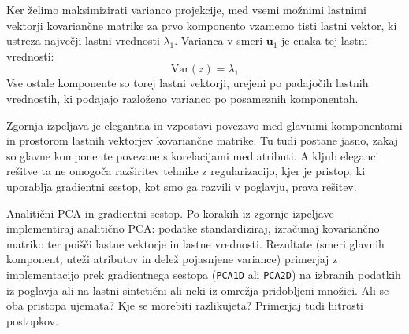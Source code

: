 \begin{enumerate}
Ker želimo maksimizirati varianco projekcije, med vsemi možnimi lastnimi vektorji kovariančne matrike za prvo komponento vzamemo tisti lastni vektor, ki ustreza največji lastni vrednosti \( \lambda_1 \). Varianca v smeri \( \mathbf{u}_1 \) je enaka tej lastni vrednosti:
%
\[
\mathrm{Var}(z) = \lambda_1
\]
Vse ostale komponente so torej lastni vektorji, urejeni po padajočih lastnih vrednostih, ki podajajo razloženo varianco po posameznih komponentah.
\end{enumerate}

Zgornja izpeljava je elegantna in vzpostavi povezavo med glavnimi komponentami in prostorom lastnih vektorjev kovariančne matrike. Tu tudi postane jasno, zakaj so glavne komponente povezane s korelacijami med atributi. A kljub eleganci rešitve ta ne omogoča razširitev tehnike z regularizacijo, kjer je pristop, ki uporablja gradientni sestop, kot smo ga razvili v poglavju, prava rešitev.

\begin{exercise}{Analitični PCA in gradientni sestop.}
Po korakih iz zgornje izpeljave implementiraj analitično PCA: podatke standardiziraj, izračunaj kovariančno matriko ter poišči lastne vektorje in lastne vrednosti. Rezultate (smeri glavnih komponent, uteži atributov in delež pojasnjene variance) primerjaj z implementacijo prek gradientnega sestopa (\texttt{PCA1D} ali \texttt{PCA2D}) na izbranih podatkih iz poglavja ali na lastni sintetični ali neki iz omrežja pridobljeni množici. Ali se oba pristopa ujemata? Kje se morebiti razlikujeta? Primerjaj tudi hitrosti postopkov.
\end{exercise}